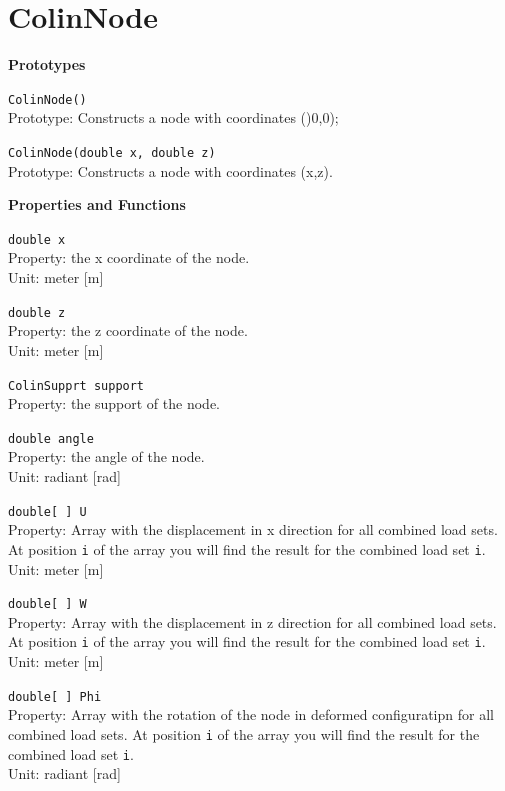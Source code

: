 \section{ColinNode}
\label{sec:jsColinNode}
\begin{trivlist}
	\item[] \textbf{Prototypes}
	\begin{trivlist}
		\leftskip=1cm
		\item[] \texttt{ColinNode()}\\ Prototype: Constructs a node with coordinates ()0,0);
		\item[] \texttt{ColinNode(double x, double z)}\\ Prototype: Constructs a node with coordinates (x,z).
	\end{trivlist}
	\item[] \textbf{Properties and Functions}
	\begin{trivlist}
		\leftskip=1cm
		\item[] \texttt{double x}\\ Property: the x coordinate of the node.\\ Unit: meter [m]
		\item[] \texttt{double z}\\ Property: the z coordinate of the node.\\ Unit: meter [m]
		\item[] \texttt{ColinSupprt support}\\ Property: the support of the node.
		\item[] \texttt{double angle}\\ Property: the angle of the node. \\ Unit: radiant [rad]
		\item[] \texttt{double[\ ] U}\\ Property: Array with the displacement in x direction for all combined load sets. At position \texttt{i} of the array you will find the result for the combined load set \texttt{i}.\\ Unit: meter [m]
		\item[] \texttt{double[\ ] W}\\ Property: Array with the displacement in z direction for all combined load sets. At position \texttt{i} of the array you will find the result for the combined load set \texttt{i}. \\ Unit: meter [m]
		\item[] \texttt{double[\ ] Phi}\\ Property: Array with the rotation of the node in deformed configuratipn for all combined load sets. At position \texttt{i} of the array you will find the result for the combined load set \texttt{i}.\\ Unit: radiant [rad]

\end{trivlist}
\end{trivlist}
